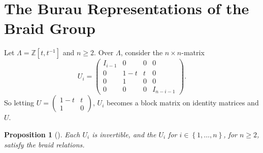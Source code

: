 \documentclass[reqno]{amsart}
\newtheorem{proposition}[theorem]{Proposition}
\theoremstyle{definition}
\theoremstyle{remark}
\begin{document}
\newpage


\section{The Burau Representations of the Braid Group}

Let $\Lambda = \mathbb{Z} \left[ t,t^{-1} \right] $ and
$n \ge 2$. Over $\Lambda$, consider the $n\times n$-matrix
\[
U_i =
\begin{pmatrix} 
    I_{i-1} & 0 & 0 & 0\\
    0 & 1-t & t & 0\\
    0 & 1 & 0 & 0\\
    0 & 0 & 0 & I_{n-i-1}
\end{pmatrix}.
\] 
So letting
$U = \begin{pmatrix} 1- t & t \\ 1 & 0 \end{pmatrix} $,
$U_i$ becomes a block matrix on identity matrices and $U$.

\begin{proposition}[]
    Each $U_i$ is invertible, and the $U_i$ for $i \in 
    \left\{ 1, \ldots, n \right\} $, for $n\ge 2$, satisfy
    the braid relations.
\end{proposition}
\end{document}
